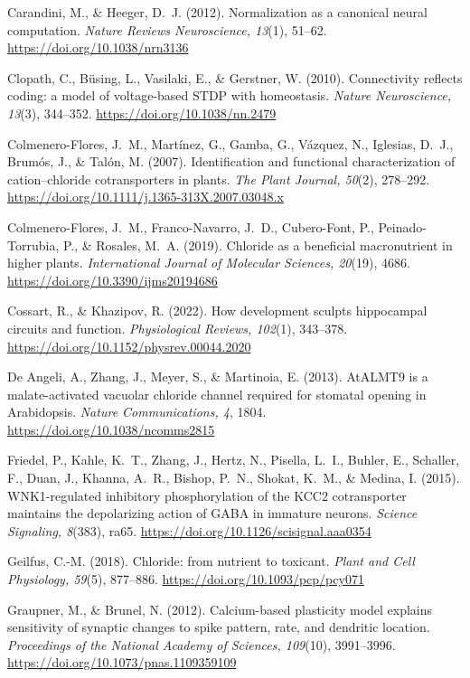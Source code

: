 \documentclass[11pt,a4paper]{article}
\newenvironment{apabib}{\raggedright\begin{list}{}{%
  \setlength{\leftmargin}{1.6em}\setlength{\itemindent}{-1.6em}%
  \setlength{\itemsep}{3pt}\setlength{\parsep}{0pt}\setlength{\topsep}{4pt}}}%
  {\end{list}}
\begin{document}
\begin{apabib}
\item Carandini, M., \& Heeger, D.~J. (2012). Normalization as a canonical neural computation. \emph{Nature Reviews Neuroscience, 13}(1), 51--62. \url{https://doi.org/10.1038/nrn3136}
\item Clopath, C., B\"using, L., Vasilaki, E., \& Gerstner, W. (2010). Connectivity reflects coding: a model of voltage-based STDP with homeostasis. \emph{Nature Neuroscience, 13}(3), 344--352. \url{https://doi.org/10.1038/nn.2479}
\item Colmenero-Flores, J.~M., Mart\'inez, G., Gamba, G., V\'azquez, N., Iglesias, D.~J., Brum\'os, J., \& Tal\'on, M. (2007). Identification and functional characterization of cation--chloride cotransporters in plants. \emph{The Plant Journal, 50}(2), 278--292. \url{https://doi.org/10.1111/j.1365-313X.2007.03048.x}
\item Colmenero-Flores, J.~M., Franco-Navarro, J.~D., Cubero-Font, P., Peinado-Torrubia, P., \& Rosales, M.~A. (2019). Chloride as a beneficial macronutrient in higher plants. \emph{International Journal of Molecular Sciences, 20}(19), 4686. \url{https://doi.org/10.3390/ijms20194686}
\item Cossart, R., \& Khazipov, R. (2022). How development sculpts hippocampal circuits and function. \emph{Physiological Reviews, 102}(1), 343--378. \url{https://doi.org/10.1152/physrev.00044.2020}
\item De Angeli, A., Zhang, J., Meyer, S., \& Martinoia, E. (2013). AtALMT9 is a malate-activated vacuolar chloride channel required for stomatal opening in Arabidopsis. \emph{Nature Communications, 4}, 1804. \url{https://doi.org/10.1038/ncomms2815}
\item Friedel, P., Kahle, K.~T., Zhang, J., Hertz, N., Pisella, L.~I., Buhler, E., Schaller, F., Duan, J., Khanna, A.~R., Bishop, P.~N., Shokat, K.~M., \& Medina, I. (2015). WNK1-regulated inhibitory phosphorylation of the KCC2 cotransporter maintains the depolarizing action of GABA in immature neurons. \emph{Science Signaling, 8}(383), ra65. \url{https://doi.org/10.1126/scisignal.aaa0354}
\item Geilfus, C.-M. (2018). Chloride: from nutrient to toxicant. \emph{Plant and Cell Physiology, 59}(5), 877--886. \url{https://doi.org/10.1093/pcp/pcy071}
\item Graupner, M., \& Brunel, N. (2012). Calcium-based plasticity model explains sensitivity of synaptic changes to spike pattern, rate, and dendritic location. \emph{Proceedings of the National Academy of Sciences, 109}(10), 3991--3996. \url{https://doi.org/10.1073/pnas.1109359109}

\end{apabib}
\end{document}
